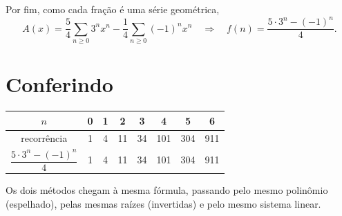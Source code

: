 Por fim, como cada fração é uma série geométrica,
\[
  A(x) = \dfrac{5}{4} \sum_{n \geq 0} 3^n x^n - \dfrac{1}{4} \sum_{n \geq 0} (-1)^n x^n
  \quad \Longrightarrow \quad
  f(n) = \dfrac{5 \cdot 3^n - (-1)^n}{4}.
\]

\section{Conferindo}

\begin{center}
  \renewcommand{\arraystretch}{1.3}
  \begin{tabular}{c|ccccccc}
    $n$ & 0 & 1 & 2 & 3 & 4 & 5 & 6 \\
    \hline
    recorrência & 1 & 4 & 11 & 34 & 101 & 304 & 911 \\
    $\dfrac{5 \cdot 3^n - (-1)^n}{4}$ & 1 & 4 & 11 & 34 & 101 & 304 & 911
  \end{tabular}
\end{center}

Os dois métodos chegam à mesma fórmula, passando pelo mesmo polinômio (espelhado), pelas mesmas raízes (invertidas) e pelo mesmo sistema linear.
